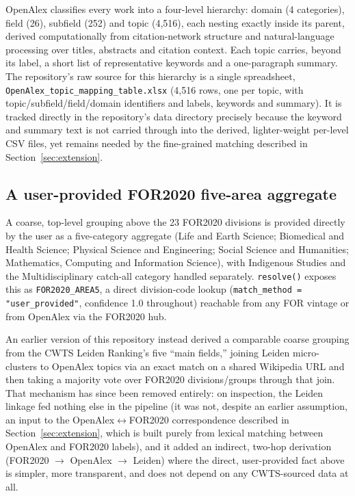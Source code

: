 \documentclass[11pt]{article}
\begin{document}
OpenAlex classifies every work into a four-level hierarchy: domain (4 categories), field
(26), subfield (252) and topic (4{,}516), each nesting exactly inside its parent, derived
computationally from citation-network structure and natural-language processing over
titles, abstracts and citation context. Each topic carries, beyond its label, a short
list of representative keywords and a one-paragraph summary. The repository's raw source
for this hierarchy is a single spreadsheet, \texttt{OpenAlex\_topic\_mapping\_table.xlsx}
(4{,}516 rows, one per topic, with topic/subfield/field/domain identifiers and labels,
keywords and summary). It is tracked directly in the repository's data directory
precisely because the keyword
and summary text is not carried through into the derived, lighter-weight per-level CSV
files, yet remains needed by the fine-grained matching described in
Section~\ref{sec:extension}.

\subsection{A user-provided FOR2020 five-area aggregate}

A coarse, top-level grouping above the 23 FOR2020 divisions is provided directly by the
user as a five-category aggregate (Life and Earth Science; Biomedical and Health Science;
Physical Science and Engineering; Social Science and Humanities; Mathematics, Computing
and Information Science), with Indigenous Studies and the Multidisciplinary catch-all
category handled separately. \texttt{resolve()} exposes this as \texttt{FOR2020\_AREA5}, a
direct division-code lookup (\texttt{match\_method = "user\_provided"}, confidence 1.0
throughout) reachable from any FOR vintage or from OpenAlex via the FOR2020 hub.

An earlier version of this repository instead derived a comparable coarse grouping from
the CWTS Leiden Ranking's five ``main fields,'' joining Leiden micro-clusters to OpenAlex
topics via an exact match on a shared Wikipedia URL and then taking a majority vote over
FOR2020 divisions/groups through that join. That mechanism has since been removed
entirely: on inspection, the Leiden linkage fed nothing else in the pipeline (it was not,
despite an earlier assumption, an input to the OpenAlex$\leftrightarrow$FOR2020
correspondence described in Section~\ref{sec:extension}, which is built purely from
lexical matching between OpenAlex and FOR2020 labels), and it added an indirect,
two-hop derivation (FOR2020 $\rightarrow$ OpenAlex $\rightarrow$ Leiden) where the direct,
user-provided fact above is simpler, more transparent, and does not depend on any
CWTS-sourced data at all.
\end{document}
